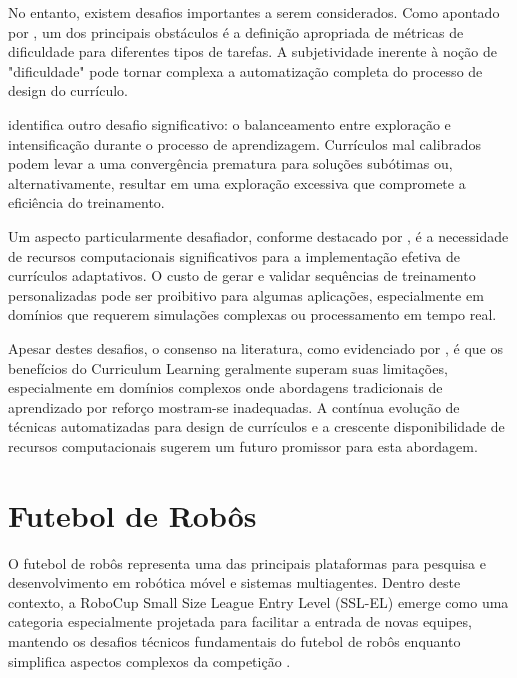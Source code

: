No entanto, existem desafios importantes a serem considerados. Como apontado por \cite{https://openreview.net/forum?id=anbBFlX1tJ1}, um dos principais obstáculos é a definição apropriada de métricas de dificuldade para diferentes tipos de tarefas. A subjetividade inerente à noção de "dificuldade" pode tornar complexa a automatização completa do processo de design do currículo.

\cite{https://jmlr.org/papers/volume21/20-212/20-212.pdf} identifica outro desafio significativo: o balanceamento entre exploração e intensificação durante o processo de aprendizagem. Currículos mal calibrados podem levar a uma convergência prematura para soluções subótimas ou, alternativamente, resultar em uma exploração excessiva que compromete a eficiência do treinamento.

Um aspecto particularmente desafiador, conforme destacado por \cite{https://dl.acm.org/doi/10.1145/3503161.3548549}, é a necessidade de recursos computacionais significativos para a implementação efetiva de currículos adaptativos. O custo de gerar e validar sequências de treinamento personalizadas pode ser proibitivo para algumas aplicações, especialmente em domínios que requerem simulações complexas ou processamento em tempo real.

Apesar destes desafios, o consenso na literatura, como evidenciado por \cite{https://arxiv.org/abs/2101.10382}, é que os benefícios do Curriculum Learning geralmente superam suas limitações, especialmente em domínios complexos onde abordagens tradicionais de aprendizado por reforço mostram-se inadequadas. A contínua evolução de técnicas automatizadas para design de currículos e a crescente disponibilidade de recursos computacionais sugerem um futuro promissor para esta abordagem.

\section{Futebol de Robôs}
\label{sec:futebol_robos}

O futebol de robôs representa uma das principais plataformas para pesquisa e desenvolvimento em robótica móvel e sistemas multiagentes. Dentro deste contexto, a RoboCup Small Size League Entry Level (SSL-EL) emerge como uma categoria especialmente projetada para facilitar a entrada de novas equipes, mantendo os desafios técnicos fundamentais do futebol de robôs enquanto simplifica aspectos complexos da competição \cite{https://robocup-ssl.github.io/ssl-rules/sslrules.html}.

